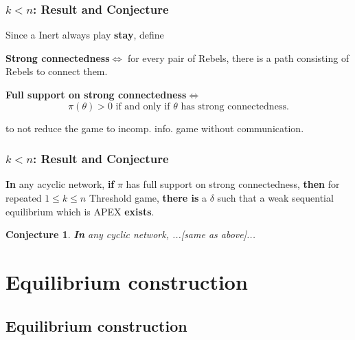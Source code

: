 \documentclass[10pt]{beamer}
\newtheorem{conjecture}{Conjecture}[section]
\begin{document}
\begin{frame}
  \frametitle{$k<n$: Result and Conjecture}

Since a Inert always play \textbf{stay}, define

\begin{definition}
\textbf{Strong connectedness}$\Leftrightarrow$ for every pair of Rebels, there is a path consisting of Rebels to connect them.
\end{definition}  

\begin{definition}
\textbf{Full support on strong connectedness}$\Leftrightarrow$ 
\[\text{$\pi(\theta)>0$ if and only if $\theta$ has strong connectedness.}\]


\end{definition}  

\alert{to not reduce the game to incomp. info. game without communication}.
\end{frame}





\begin{frame}
  \frametitle{$k<n$: Result and Conjecture}



\begin{theorem}
\label{thm_main_result}
\textbf{In} any \alert{acyclic} network, \textbf{if} $\pi$ has full support  {on strong connectedness}, \textbf{then} for repeated $1\leq k \leq n$ Threshold game, \textbf{there is} a $\delta$ such that a {weak} sequential equilibrium which is APEX \textbf{exists}.
\end{theorem}

\begin{conjecture}
\textbf{In} any \alert{cyclic} network, ...[same as above]...
\end{conjecture}

\end{frame}

\section{Equilibrium construction}
\subsection{Equilibrium construction}
\end{document}
